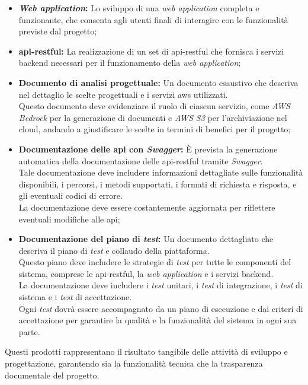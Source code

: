 \begin{itemize}
    \item \textbf{\textit{Web application}:} Lo sviluppo di una \textit{web application} completa e funzionante, che consenta agli utenti finali di interagire con le funzionalità previste dal progetto;
    \item \textbf{\gls{api-restful}:} La realizzazione di un set di \gls{api-restful} che fornisca i servizi \gls{backend} necessari per il funzionamento della \textit{web application};
    \item \textbf{Documento di analisi progettuale:} Un documento esaustivo che descriva nel dettaglio le scelte progettuali e i servizi \gls{aws} utilizzati.\\
    Questo documento deve evidenziare il ruolo di ciascun servizio, come \textit{AWS Bedrock} per la generazione di documenti e \textit{AWS S3} per l’archiviazione nel cloud, 
    andando a giustificare le scelte in termini di benefici per il progetto;
    \item \textbf{Documentazione delle \gls{api} con \textit{Swagger}:} È prevista la generazione automatica della documentazione delle \gls{api-restful} tramite \textit{Swagger}. \\
    Tale documentazione deve includere informazioni dettagliate sulle funzionalità disponibili, i percorsi, i metodi supportati, i formati di richiesta e risposta, e gli eventuali codici di errore. \\
    La documentazione deve essere costantemente aggiornata per riflettere eventuali modifiche alle \gls{api};
    \item \textbf{Documentazione del piano di \textit{test}:} Un documento dettagliato che descriva il piano di \textit{test} e collaudo della piattaforma. \\
    Questo piano deve includere le strategie di \textit{test} per tutte le componenti del sistema, comprese le \gls{api-restful}, la \textit{web application} e i servizi \gls{backend}.\\
    La documentazione deve includere i \textit{test} unitari, i \textit{test} di integrazione, i \textit{test} di sistema e i \textit{test} di accettazione. \\
    Ogni \textit{test} dovrà essere accompagnato da un piano di esecuzione e dai criteri di accettazione per garantire la qualità e la funzionalità del sistema in ogni sua parte.\\
\end{itemize}

\noindent Questi prodotti rappresentano il risultato tangibile delle attività di sviluppo e progettazione, garantendo sia la funzionalità tecnica che la trasparenza documentale del progetto.
